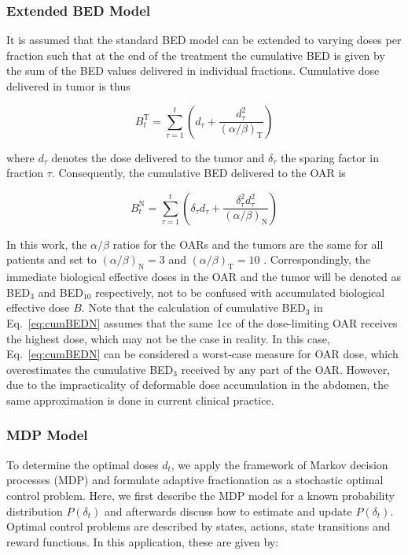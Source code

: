 \documentclass[\relativeRoot/ada.tex]{subfiles}
\begin{document}
\subsubsection{Extended BED Model}

It is assumed that the standard BED model can be extended to varying doses per fraction such that at the end of the treatment the cumulative BED is given by the sum of the BED values delivered in individual fractions. Cumulative dose delivered in tumor is thus

\begin{equation}\label{eq:cumBEDT}
    B^\text{T}_t = \sum_{\tau=1}^t(d_\tau+\frac{d_\tau^2}{({\alpha}/{\beta})_\text{T}})
\end{equation}

where $d_\tau$ denotes the dose delivered to the tumor and $\delta_\tau$ the sparing factor in fraction $\tau$. Consequently, the cumulative BED delivered to the OAR is

\begin{equation}\label{eq:cumBEDN}
B^\text{N}_t = \sum_{\tau=1}^t(\delta_\tau d_\tau+\frac{\delta_\tau^2 d_\tau^2}{({\alpha}/{\beta})_\text{N}})
\end{equation}

In this work, the ${\alpha}/{\beta}$ ratios for the OARs and the tumors are the same for all patients and set to $({\alpha}/{\beta})_\text{N} = 3$ and $({\alpha}/{\beta})_\text{T} = 10$ \cite{van_leeuwen_alfabeta}. Correspondingly, the immediate biological effective doses in the OAR and the tumor will be denoted as BED$_3$ and BED$_{10}$ respectively, not to be confused with accumulated biological effective dose $B$. Note that the calculation of cumulative BED$_3$ in Eq.~\eqref{eq:cumBEDN} assumes that the same 1cc of the dose-limiting OAR receives the highest dose, which may not be the case in reality. In this case, Eq.~\eqref{eq:cumBEDN} can be considered a worst-case measure for OAR dose, which overestimates the cumulative BED$_3$ received by any part of the OAR. However, due to the impracticality of deformable dose accumulation in the abdomen, the same approximation is done in current clinical practice.

\subsubsection{MDP Model}
To determine the  optimal doses $d_t$, we apply the framework of Markov decision processes (MDP) and formulate adaptive fractionation as a stochastic optimal control problem. Here, we first describe the MDP model for a known probability distribution $P(\delta_t)$ and afterwards discuss how to estimate and update $P(\delta_t)$. Optimal control problems are described by states, actions, state transitions and reward functions. In this application, these are given by:\\
\end{document}
